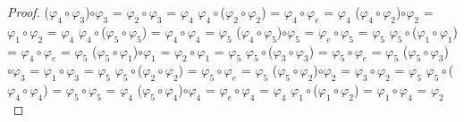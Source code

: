 \documentclass[10pt,a4paper,oneside]{article}
\begin{document}
\begin{proof}
				\newline
				($\varphi_{4}\circ\varphi_{3}$)$\circ\varphi_{3}$ = $\varphi_{2}\circ\varphi_{3}$ = $\varphi_{4}$
				\newline
				\newline
				$\varphi_{4}\circ$($\varphi_{2}\circ\varphi_{2}$) = $\varphi_{4}\circ\varphi_{e}$ = $\varphi_{4}$
				\newline
				($\varphi_{4}\circ\varphi_{2}$)$\circ\varphi_{2}$ = $\varphi_{1}\circ\varphi_{2}$ = $\varphi_{4}$
				\newline
				\newline
				$\varphi_{4}\circ$($\varphi_{5}\circ\varphi_{5}$) = $\varphi_{4}\circ\varphi_{4}$ = $\varphi_{5}$
				\newline
				($\varphi_{4}\circ\varphi_{5}$)$\circ\varphi_{5}$ = $\varphi_{e}\circ\varphi_{5}$ = $\varphi_{5}$
				\newline
				\newline
				$\varphi_{5}\circ$($\varphi_{1}\circ\varphi_{1}$) = $\varphi_{4}\circ\varphi_{e}$ = $\varphi_{5}$
				\newline
				($\varphi_{5}\circ\varphi_{1}$)$\circ\varphi_{1}$ = $\varphi_{2}\circ\varphi_{1}$ = $\varphi_{5}$
				\newline
				\newline
				$\varphi_{5}\circ$($\varphi_{3}\circ\varphi_{3}$) = $\varphi_{5}\circ\varphi_{e}$ = $\varphi_{5}$
				\newline
				($\varphi_{5}\circ\varphi_{3}$)$\circ\varphi_{3}$ = $\varphi_{1}\circ\varphi_{3}$ = $\varphi_{5}$
				\newline
				\newline
				$\varphi_{5}\circ$($\varphi_{2}\circ\varphi_{2}$) = $\varphi_{5}\circ\varphi_{e}$ = $\varphi_{5}$
				\newline
				($\varphi_{5}\circ\varphi_{2}$)$\circ\varphi_{2}$ = $\varphi_{3}\circ\varphi_{2}$ = $\varphi_{5}$
				\newline
				\newline
				$\varphi_{5}\circ$($\varphi_{4}\circ\varphi_{4}$) = $\varphi_{5}\circ\varphi_{5}$ = $\varphi_{4}$
				\newline
				($\varphi_{5}\circ\varphi_{4}$)$\circ\varphi_{4}$ = $\varphi_{e}\circ\varphi_{4}$ = $\varphi_{4}$
				\newline
				\newline
				$\varphi_{1}\circ$($\varphi_{1}\circ\varphi_{2}$) = $\varphi_{1}\circ\varphi_{4}$ = $\varphi_{2}$
				\newline

\end{proof}
\end{document}
